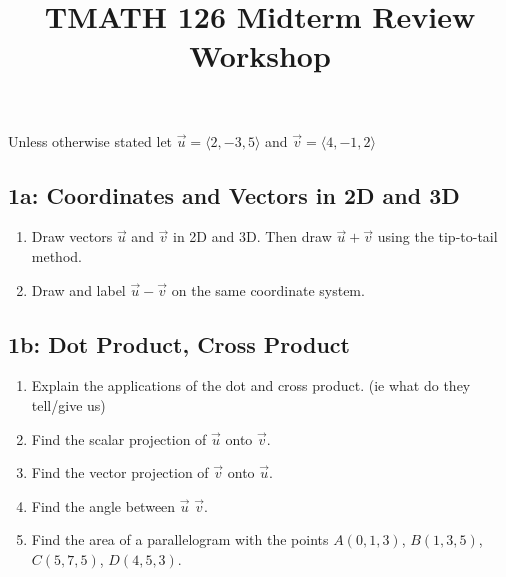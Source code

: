 \documentclass[11pt]{article}
\title{TMATH 126 Midterm Review Workshop}
\author{}
\date{\vspace{-5ex}}
\newenvironment{exercise}{
    \begin{mdframed}[style=problemstyle]\textcolor{black}{}
}{
    \end{mdframed}
}
\begin{document}
\maketitle
\vspace{-5ex}%

Unless otherwise stated let $\vec{u} = \langle 2,-3,5 \rangle$ and 
$\vec{v} = \langle 4, -1, 2 \rangle $ 
\subsection*{1a: Coordinates and Vectors in 2D and 3D}
\begin{exercise}
    \begin{enumerate}[label={\alph*}]
        \item Draw vectors $\vec{u}$ and $\vec{v}$ in 2D and 3D. 
            Then draw $\vec{u} + \vec{v}$ using the tip-to-tail method.
        \item Draw and label $\vec{u} - \vec{v}$ on the same coordinate 
            system.
    \end{enumerate}
\end{exercise}

\subsection*{1b: Dot Product, Cross Product}
\begin{exercise}
    \begin{enumerate}[label={\alph*}]
        \item Explain the applications of the dot and cross product.
            (ie what do they tell/give us)
        \item Find the scalar projection of $\vec{u}$ onto $\vec{v}$.
        \item Find the vector projection of $\vec{v}$ onto $\vec{u}$.
        \item Find the angle between $\vec{u}$ $\vec{v}$.
        \item Find the area of a parallelogram with the points $A(0,1,3)$, 
            $B(1,3,5)$, $C(5,7,5)$, $D(4,5,3)$.
    \end{enumerate}
\end{exercise}
\end{document}
